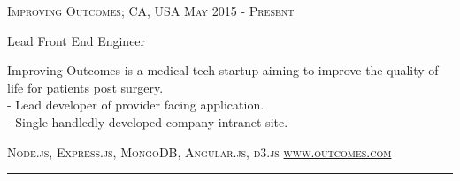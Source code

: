 {
    {\small \textsc{
        Improving Outcomes; CA, USA
        \hfill
        {\raggedleft
            May 2015 - Present
        }}
    }

    {\raggedright\large {
        Lead Front End Engineer
    } \\}

    \normalsize{
        Improving Outcomes is a medical tech startup aiming to improve the quality of life for patients post surgery. \\
        - Lead developer of provider facing application. \\
        - Single handledly developed company intranet site.
    }

    \textsc{\small{
            \color{highlight}
            Node.js,
            Express.js,
            MongoDB,
            Angular.js,
            d3.js
        }
        \hfill
        {\raggedleft
            \href{http://www.outcomes.com}{www.outcomes.com}
        }
    }

    \begin{center}
        \color{highlight}
        \rule{0.5\textwidth}{.4pt}
    \end{center}
}
